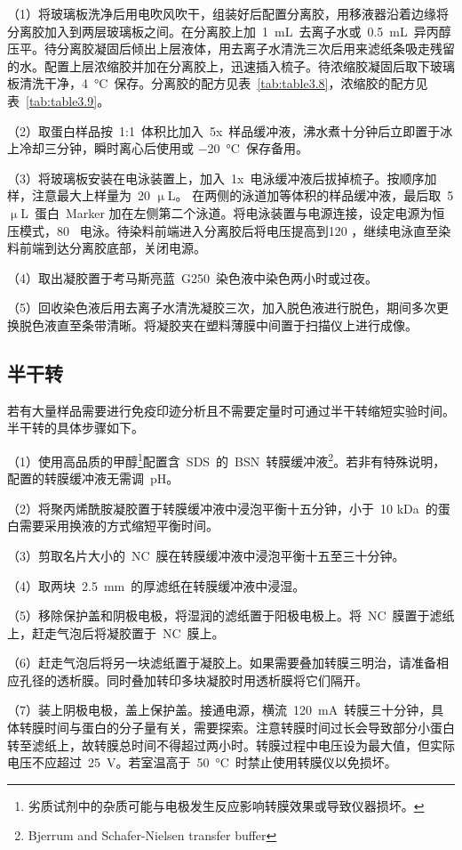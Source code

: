 （1）将玻璃板洗净后用电吹风吹干，组装好后配置分离胶，用移液器沿着边缘将分离胶加入到两层玻璃板之间。在分离胶上加\ \SI{1}{\mL}\ 去离子水或\ \SI{0.5}{\mL}\ 异丙醇压平。待分离胶凝固后倾出上层液体，用去离子水清洗三次后用来滤纸条吸走残留的水。配置上层浓缩胶并加在分离胶上，迅速插入梳子。待浓缩胶凝固后取下玻璃板清洗干净，\SI{4}{\degreeCelsius}\ 保存。分离胶的配方见表\ \ref{tab:table3.8}，浓缩胶的配方见表\ \ref{tab:table3.9}。

（2）取蛋白样品按\ 1:1\ 体积比加入\ 5x\ 样品缓冲液，沸水煮十分钟后立即置于冰上冷却三分钟，瞬时离心后使用或
\SI{-20}{\degreeCelsius}\ 保存备用。

（3）将玻璃板安装在电泳装置上，加入\ 1x\ 电泳缓冲液后拔掉梳子。按顺序加样，注意最大上样量为\ 20 $\upmu$L。 在两侧的泳道加等体积的样品缓冲液，最后取\ 5 $\upmu$L\ 蛋白\ Marker 加在左侧第二个泳道。将电泳装置与电源连接，设定电源为恒压模式，80 \volt\ 电泳。待染料前端进入分离胶后将电压提高到120 \volt ，继续电泳直至染料前端到达分离胶底部，关闭电源。

（4）取出凝胶置于考马斯亮蓝\ G250\ 染色液中染色两小时或过夜。

（5）回收染色液后用去离子水清洗凝胶三次，加入脱色液进行脱色，期间多次更换脱色液直至条带清晰。将凝胶夹在塑料薄膜中间置于扫描仪上进行成像。

\subsection{半干转}
若有大量样品需要进行免疫印迹分析且不需要定量时可通过半干转缩短实验时间。半干转的具体步骤如下。

（1）使用高品质的甲醇\footnote{劣质试剂中的杂质可能与电极发生反应影响转膜效果或导致仪器损坏。}配置含\ SDS\ 的\ BSN\ 转膜缓冲液\footnote{Bjerrum and Schafer-Nielsen transfer buffer}。若非有特殊说明，配置的转膜缓冲液无需调\ pH。

（2）将聚丙烯酰胺凝胶置于转膜缓冲液中浸泡平衡十五分钟，小于\ 10 kDa\ 的蛋白需要采用换液的方式缩短平衡时间。

（3）剪取名片大小的\ NC\ 膜在转膜缓冲液中浸泡平衡十五至三十分钟。

（4）取两块\ \SI{2.5}{\mm}\ 的厚滤纸在转膜缓冲液中浸湿。

（5）移除保护盖和阴极电极，将湿润的滤纸置于阳极电极上。将\ NC\ 膜置于滤纸上，赶走气泡后将凝胶置于\ NC\ 膜上。

（6）赶走气泡后将另一块滤纸置于凝胶上。如果需要叠加转膜三明治，请准备相应孔径的透析膜。同时叠加转印多块凝胶时用透析膜将它们隔开。

（7）装上阴极电极，盖上保护盖。接通电源，横流\ \SI{120}{\mA}\ 转膜三十分钟，具体转膜时间与蛋白的分子量有关，需要探索。注意转膜时间过长会导致部分小蛋白转至滤纸上，故转膜总时间不得超过两小时。转膜过程中电压设为最大值，但实际电压不应超过\ \SI{25}{\volt}。若室温高于\ \SI{50}{\degreeCelsius}\ 时禁止使用转膜仪以免损坏。

